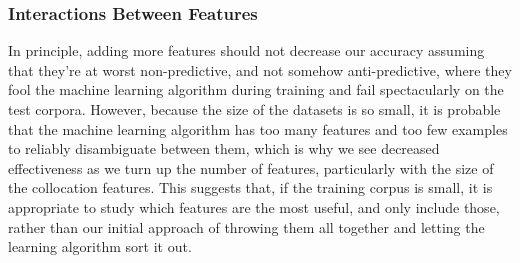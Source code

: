\documentclass{article}
\begin{document}
\subsubsection{Interactions Between Features}

In principle, adding more features should not decrease our accuracy assuming
that they're at worst non-predictive, and not somehow anti-predictive, where
they fool the machine learning algorithm during training and fail spectacularly
on the test corpora.  However, because the size of the datasets is so small, it
is probable that the machine learning algorithm has too many features and too
few examples to reliably disambiguate between them, which is why we see
decreased effectiveness as we turn up the number of features, particularly with
the size of the collocation features.  This suggests that, if the training
corpus is small, it is appropriate to study which features are the most useful,
and only include those, rather than our initial approach of throwing them all
together and letting the learning algorithm sort it out.
\end{document}
